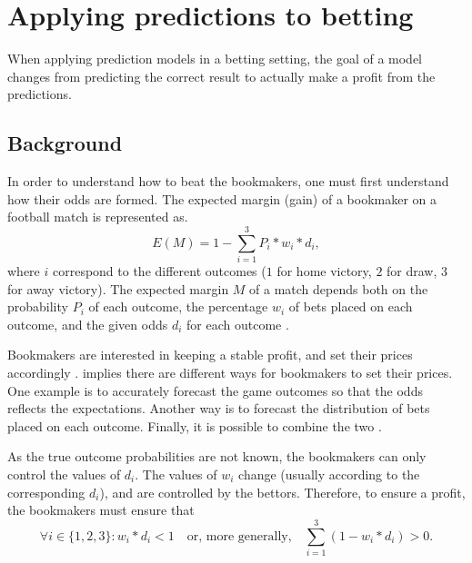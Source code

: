 \section{Applying predictions to betting}

When applying prediction models in a betting setting, the goal of a model changes from predicting the correct result to actually make a profit from the predictions.

\subsection{Background}

In order to understand how to beat the bookmakers, one must first understand how their odds are formed. The expected margin (gain) of a bookmaker on a football match is represented as.
\begin{equation}
    E(M) = 1 - \sum_{i=1}^{3} P_{i} * w_{i} * d_{i},
    \label{eq:vlastakis-dotsis-markellos-margin}
\end{equation}
where $i$ correspond to the different outcomes ($1$ for home victory, $2$ for draw, $3$ for away victory). The expected margin $M$ of a match depends both on the probability $P_{i}$ of each outcome, the percentage $w_{i}$ of bets placed on each outcome, and the given odds $d_{i}$ for each outcome \citep{bib:vlastakis-dotsis-markellos-2009}.

Bookmakers are interested in keeping a stable profit, and set their prices accordingly \citep{bib:vlastakis-dotsis-markellos-2009}.  implies there are different ways for bookmakers to set their prices. One example is to accurately forecast the game outcomes so that the odds reflects the expectations. Another way is to forecast the distribution of bets placed on each outcome. Finally, it is possible to combine the two \citep{bib:vlastakis-dotsis-markellos-2009}.

As the true outcome probabilities are not known, the bookmakers can only control the values of $d_{i}$. The values of $w_{i}$ change (usually according to the corresponding $d_{i}$), and are controlled by the bettors. Therefore, to ensure a profit, the bookmakers must ensure that
\begin{equation*}
    \forall i \in \{1, 2, 3\}: w_{i} * d_{i} < 1
    \quad \text{or, more generally,} \quad
    \sum_{i=1}^{3} (1 - w_{i} * d_{i}) > 0.
\end{equation*}

